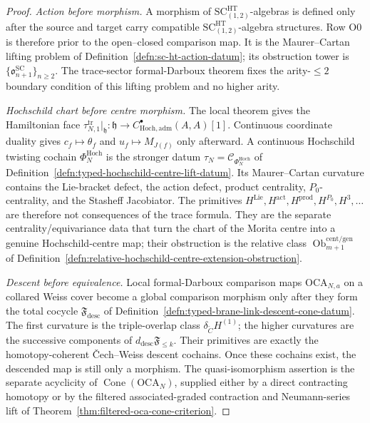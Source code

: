 \begin{proof}
\emph{Action before morphism.}  A morphism of
\(\mathrm{SC}^{\mathrm{HT}}_{(1,2)}\)-algebras is defined only after the
source and target carry compatible
\(\mathrm{SC}^{\mathrm{HT}}_{(1,2)}\)-algebra structures.  Row
\(\mathrm{O0}\) is therefore prior to the open--closed comparison map.
It is the Maurer--Cartan lifting problem of
Definition~\ref{defn:sc-ht-action-datum}; its obstruction tower is
\(\{\mathfrak o^{\mathrm{SC}}_{n+1}\}_{n\ge2}\).  The trace-sector
formal-Darboux theorem fixes the arity-\(\le2\) boundary condition of
this lifting problem and no higher arity.

\emph{Hochschild chart before centre morphism.}  The local theorem gives
the Hamiltonian face
\(\tau_{N,1}^{\mathrm{tr}}|_{\mathfrak h}\colon\mathfrak h\to
C^\bullet_{\mathrm{Hoch},\mathrm{adm}}(A,A)[1]\).  Continuous
coordinate duality gives \(c_f\mapsto\theta_f\) and
\(u_f\mapsto M_{J(f)}\) only afterward.  A continuous Hochschild
twisting cochain \(\Phi_N^{\mathrm{Hoch}}\) is the stronger datum
\(\tau_N=\mathcal C_{\Phi_N^{\mathrm{Hoch}}}\) of
Definition~\ref{defn:typed-hochschild-centre-lift-datum}.  Its
Maurer--Cartan curvature contains the Lie-bracket defect, the action
defect, product centrality, \(P_0\)-centrality, and the Stasheff
Jacobiator.  The primitives
\(H^{\mathrm{Lie}},H^{\mathrm{act}},H^{\mathrm{prod}},H^{P_0},H^3,\ldots\)
are therefore not consequences of the trace formula.  They are the
separate centrality/equivariance data that turn the chart of the Morita
centre into a genuine Hochschild-centre map; their obstruction is the
relative class
\(\operatorname{Ob}^{\mathrm{cent}/\mathrm{gen}}_{m+1}\) of
Definition~\ref{defn:relative-hochschild-centre-extension-obstruction}.

\emph{Descent before equivalence.}  Local formal-Darboux comparison maps
\(\mathrm{OCA}_{N,a}\) on a collared Weiss cover become a global
comparison morphism only after they form the total cocycle
\(\mathfrak F_{\mathrm{desc}}\) of
Definition~\ref{defn:typed-brane-link-descent-cone-datum}.  The first
curvature is the triple-overlap class
\(\delta_{\check C}H^{(1)}\); the higher curvatures are the successive
components of \(d_{\mathrm{desc}}\mathfrak F_{\le k}\).  Their
primitives are exactly the homotopy-coherent \v{C}ech--Weiss descent
cochains.  Once these cochains exist, the descended map is still only a
morphism.  The quasi-isomorphism assertion is the separate acyclicity of
\(\operatorname{Cone}(\mathrm{OCA}_N)\), supplied either by a direct
contracting homotopy or by the filtered associated-graded contraction
and Neumann-series lift of Theorem~\ref{thm:filtered-oca-cone-criterion}.


\end{proof}
